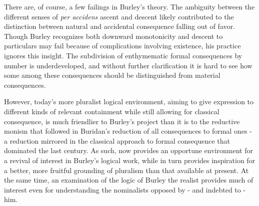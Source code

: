 	There are, of course, a few failings in Burley's theory. The ambiguity between the different senses of \textit{per accidens} ascent and descent likely contributed to the distinction between natural and accidental consequence falling out of favor. Though Burley recognizes both downward monotonicity and descent to particulars may fail because of complications involving existence, his practice ignores this insight. The subdivision of enthymematic formal consequences by number is underdeveloped, and without further clarification it is hard to see how some among these consequences should be distinguished from material consequences. 
	
	However, today's more pluralist logical environment, aiming to give expression to different kinds of relevant containment while still allowing for classical consequence, is much friendlier to Burley's project than it is to the reductive monism that followed in Buridan's reduction of all consequences to formal ones - a reduction mirrored in the classical approach to formal consequence that dominated the last century. As such, now provides an opportune environment for a revival of interest in Burley's logical work, while in turn provides inspiration for a better, more fruitful grounding of pluralism than that available at present. At the same time, an examination of the logic of Burley the realist provides much of interest even for understanding the nominalists opposed by - and indebted to - him.
